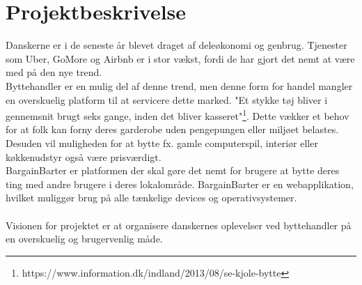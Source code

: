 \chapter{Projektbeskrivelse}

Danskerne er i de seneste år blevet draget af deleøkonomi og genbrug. Tjenester som Uber, GoMore og Airbnb er i stor vækst, fordi de har gjort det nemt at være med på den nye trend. \\Byttehandler er en mulig del af denne trend, men denne form for handel mangler en overskuelig platform til at servicere dette marked. "Et stykke tøj bliver i gennemsnit brugt seks gange, inden det bliver kasseret"\footnote{https://www.information.dk/indland/2013/08/se-kjole-bytte}. Dette vækker et behov for at folk kan forny deres garderobe uden pengepungen eller miljøet belastes. Desuden vil muligheden for at bytte fx. gamle computerspil, interiør eller køkkenudstyr også være prisværdigt. \\
BargainBarter er platformen der skal gøre det nemt for brugere at bytte deres ting med andre brugere i deres lokalområde. BargainBarter er en webapplikation, hvilket muliggør brug på alle tænkelige devices og operativsystemer. \\ \\
Visionen for projektet er at organisere danskernes oplevelser ved byttehandler på en overskuelig og brugervenlig måde.
